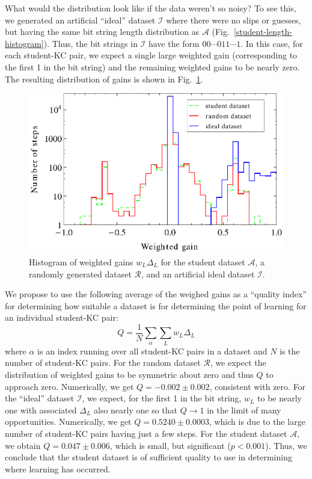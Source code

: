 \documentclass{acmlarge-edm}
\begin{document}
What would the distribution look like if the data weren't 
so noisy?  To see this, we generated an artificial ``ideal'' dataset
$\mathcal{I}$ where there were no slips or guesses, but having
the same bit string length distribution as $\mathcal{A}$ 
(Fig.~\ref{student-length-histogram}).  Thus, the bit strings
in $\mathcal{I}$ have the form $00\cdots011\cdots1$.
In this case, for each student-KC pair, we expect a single 
large weighted gain (corresponding to the first 1 in the bit string) 
and the remaining weighted gains to be nearly zero.  The resulting 
distribution of gains is shown
in  Fig.~\ref{weighted-gain-histogram2}.

\begin{figure}
  \centering \includegraphics{weighted-gain-histogram2.eps}
   \caption{Histogram of weighted gains $w_L \Delta_L$ for
     the student dataset $\mathcal{A}$, 
     a randomly generated dataset $\mathcal{R}$,
     and an artificial ideal dataset $\mathcal{I}$.}
    \label{weighted-gain-histogram2}
\end{figure}


We propose to use the following average of the weighed gains as
a ``quality index'' for determining how suitable a 
dataset is for determining the point of learning for an individual
student-KC pair:
%
\begin{equation}
           Q= \frac{1}{N} \sum_\alpha \sum_L w_L \Delta_L
\end{equation}
%
where $\alpha$ is an index running over all student-KC pairs in a 
dataset and $N$ is the number of student-KC pairs.
For the random dataset $\mathcal{R}$, we expect the distribution of 
weighted gains to be symmetric about zero and thus $Q$ to approach zero.  
Numerically, we get  $Q=-0.002\pm0.002$, consistent with zero.
For the ``ideal'' dataset $\mathcal{I}$,
we expect, for the first 1 in the bit string, $w_L$ to be nearly one 
with associated $\Delta_L$ also nearly one so that $Q\to 1$ in
the limit of many opportunities.
Numerically, we get $Q=0.5240\pm0.0003$, which is due to the 
large number of student-KC pairs having just a few steps.  
For the student dataset $\mathcal{A}$, we obtain $Q=0.047\pm0.006$, which
is small, but significant ($p<0.001$). Thus, we conclude that the
student dataset is of sufficient quality to use in determining where learning has occurred.
\end{document}
